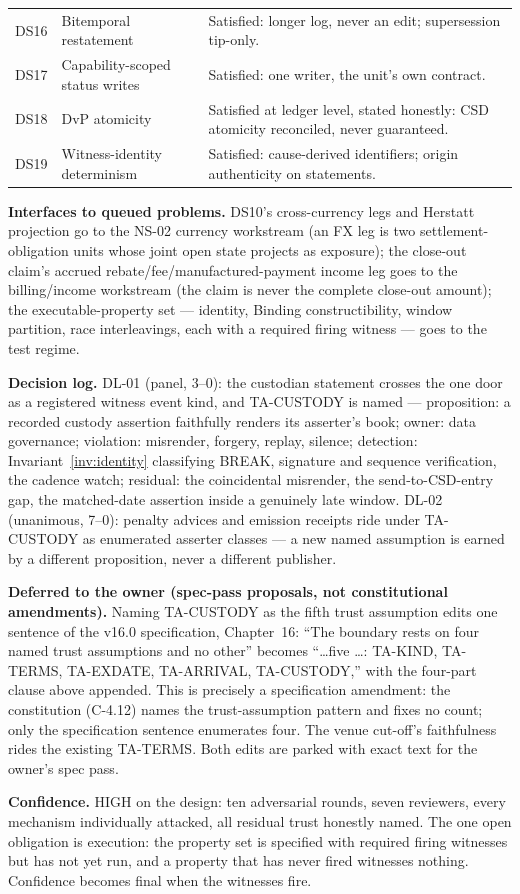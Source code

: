 \documentclass[11pt]{article}
\begin{document}
{\begin{longtable}{@{}llp{8.6cm}@{}}
DS16 & Bitemporal restatement & Satisfied: longer log, never an edit; supersession tip-only. \\
DS17 & Capability-scoped status writes & Satisfied: one writer, the unit's own contract. \\
DS18 & DvP atomicity & Satisfied at ledger level, stated honestly: CSD atomicity reconciled, never guaranteed. \\
DS19 & Witness-identity determinism & Satisfied: cause-derived identifiers; origin authenticity on statements. \\
\bottomrule
\end{longtable}}

\textbf{Interfaces to queued problems.} DS10's cross-currency legs and Herstatt
projection go to the NS-02 currency workstream (an FX leg is two
settlement-obligation units whose joint open state projects as exposure); the
close-out claim's accrued rebate/fee/manufactured-payment income leg goes to the
billing/income workstream (the claim is never the complete close-out amount); the
executable-property set --- identity, Binding constructibility, window partition,
race interleavings, each with a required firing witness --- goes to the test
regime.

\textbf{Decision log.} DL-01 (panel, 3--0): the custodian statement crosses the
one door as a registered witness event kind, and TA-CUSTODY is named ---
proposition: a recorded custody assertion faithfully renders its asserter's book;
owner: data governance; violation: misrender, forgery, replay, silence; detection:
Invariant~\ref{inv:identity} classifying BREAK, signature and sequence
verification, the cadence watch; residual: the coincidental misrender, the
send-to-CSD-entry gap, the matched-date assertion inside a genuinely late window.
DL-02 (unanimous, 7--0): penalty advices and emission receipts ride under
TA-CUSTODY as enumerated asserter classes --- a new named assumption is earned by
a different proposition, never a different publisher.

\textbf{Deferred to the owner (spec-pass proposals, not constitutional
amendments).} Naming TA-CUSTODY as the fifth trust assumption edits one sentence
of the v16.0 specification, Chapter~16: ``The boundary rests on four named trust
assumptions and no other'' becomes ``\dots five \dots: TA-KIND, TA-TERMS,
TA-EXDATE, TA-ARRIVAL, TA-CUSTODY,'' with the four-part clause above appended.
This is precisely a specification amendment: the constitution (C-4.12) names the
trust-assumption pattern and fixes no count; only the specification sentence
enumerates four. The venue cut-off's faithfulness rides the existing TA-TERMS.
Both edits are parked with exact text for the owner's spec pass.

\textbf{Confidence.} HIGH on the design: ten adversarial rounds, seven reviewers,
every mechanism individually attacked, all residual trust honestly named. The one
open obligation is execution: the property set is specified with required firing
witnesses but has not yet run, and a property that has never fired witnesses
nothing. Confidence becomes final when the witnesses fire.
\end{document}
